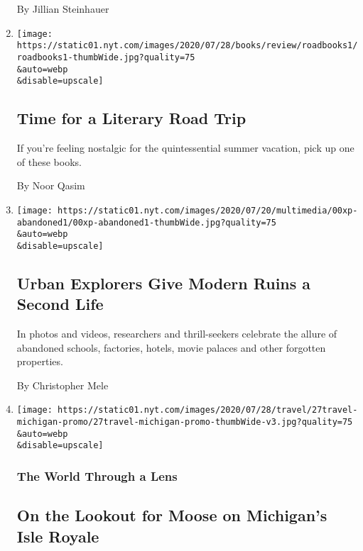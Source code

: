\begin{enumerate}
  By Jillian Steinhauer
\item
  \href{/2020/07/28/books/time-for-a-literary-road-trip.html}{}

  \texttt{[image: https://static01.nyt.com/images/2020/07/28/books/review/roadbooks1/roadbooks1-thumbWide.jpg?quality=75\\\&auto=webp\\\&disable=upscale]}

  \hypertarget{time-for-a-literary-road-trip}{%
  \subsection{Time for a Literary Road
  Trip}\label{time-for-a-literary-road-trip}}

  If you're feeling nostalgic for the quintessential summer vacation,
  pick up one of these books.

  By Noor Qasim
\item
  \href{/2020/07/27/us/abandoned-properties-to-explore.html}{}

  \texttt{[image: https://static01.nyt.com/images/2020/07/20/multimedia/00xp-abandoned1/00xp-abandoned1-thumbWide.jpg?quality=75\\\&auto=webp\\\&disable=upscale]}

  \hypertarget{urban-explorers-give-modern-ruins-a-second-life}{%
  \subsection{Urban Explorers Give Modern Ruins a Second
  Life}\label{urban-explorers-give-modern-ruins-a-second-life}}

  In photos and videos, researchers and thrill-seekers celebrate the
  allure of abandoned schools, factories, hotels, movie palaces and
  other forgotten properties.

  By Christopher Mele
\item
  \href{/2020/07/27/travel/moose-michigan-isle-royale.html}{}

  \texttt{[image: https://static01.nyt.com/images/2020/07/28/travel/27travel-michigan-promo/27travel-michigan-promo-thumbWide-v3.jpg?quality=75\\\&auto=webp\\\&disable=upscale]}

  \hypertarget{the-world-through-a-lens}{%
  \subsubsection{The World Through a
  Lens}\label{the-world-through-a-lens}}

  \hypertarget{on-the-lookout-for-moose-on-michigans-isle-royale}{%
  \subsection{On the Lookout for Moose on Michigan's Isle
  Royale}\label{on-the-lookout-for-moose-on-michigans-isle-royale}}


\end{enumerate}
